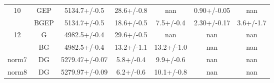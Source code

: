 \begin{table}[h]
\begin{tabular}{ccccccc}
\multirow[t]{2}{*}{10} & GEP & 5134.7+/-0.5 & 28.6+/-0.8 & nan & 0.90+/-0.05 & nan \\
 & BGEP & 5134.7+/-0.5 & 18.6+/-0.5 & 7.5+/-0.4 & 2.30+/-0.17 & 3.6+/-1.7 \\
\multirow[t]{2}{*}{12} & G & 4982.5+/-0.4 & 29.6+/-0.5 & nan & nan & nan \\
 & BG & 4982.5+/-0.4 & 13.2+/-1.1 & 13.2+/-1.0 & nan & nan \\
norm7 & DG & 5279.47+/-0.07 & 5.8+/-0.4 & 9.9+/-0.6 & nan & nan \\
norm8 & DG & 5279.97+/-0.09 & 6.2+/-0.6 & 10.1+/-0.8 & nan & nan \\
\bottomrule
\end{tabular}
\end{table}
